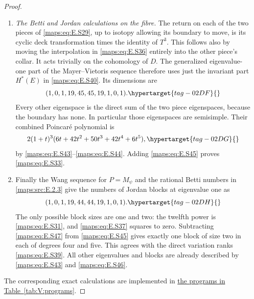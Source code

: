 \documentclass[11pt,a4paper]{article}
\numberwithin{equation}{section}
\theoremstyle{definition}
\begin{document}
\begin{proof}
\begin{enumerate}[label=\arabic*.,leftmargin=*]
\item \emph{The Betti and Jordan calculations on the fibre.}
The return on each of the two pieces of \eqref{maps:eq:E.S29}, up to
isotopy allowing its boundary to move, is its cyclic deck
transformation times the identity of $T^3$. This follows
also by moving the interpolation in \eqref{maps:eq:E.S36} entirely into
the other piece's collar. It acts trivially on the
cohomology of $D$. The generalized eigenvalue-one part of
the Mayer--Vietoris sequence therefore uses just the
invariant part $H^*(E)$ in \eqref{maps:eq:E.S40}. Its dimensions are
\begin{equation}
       (1,0,1,19,45,45,19,1,0,1).
 \hypertarget{tag-02DF}{}\label{maps:eq:E.S45}
\end{equation}
Every other eigenspace is the direct sum of the two piece
eigenspaces, because the boundary has none. In particular
those eigenspaces are semisimple. Their combined Poincar\'e
polynomial is
\begin{equation}
     2(1+t)^3(6t+42t^2+50t^3+42t^4+6t^5),
 \hypertarget{tag-02DG}{}\label{maps:eq:E.S46}
\end{equation}
by \eqref{maps:eq:E.S43}--\eqref{maps:eq:E.S44}. Adding \eqref{maps:eq:E.S45} proves \eqref{maps:eq:E.S33}.

\item Finally the Wang sequence for $P=M_\psi$ and the rational
Betti numbers in \cref{maps:src:E.2.3} give the numbers of Jordan blocks
at eigenvalue one as
\begin{equation}
          (1,0,1,19,44,44,19,1,0,1).
 \hypertarget{tag-02DH}{}\label{maps:eq:E.S47}
\end{equation}
The only possible block sizes are one and two: the
twelfth power is \eqref{maps:eq:E.S31}, and \eqref{maps:eq:E.S37} squares to zero.
Subtracting \eqref{maps:eq:E.S47} from \eqref{maps:eq:E.S45} gives exactly one block
of size two in each of degrees four and five. This agrees with the direct variation ranks \eqref{maps:eq:E.S39}.
All other eigenvalues and blocks are already described
by \eqref{maps:eq:E.S43} and \eqref{maps:eq:E.S46}. \end{enumerate}
The corresponding exact calculations are implemented in \hyperlink{prog:V:cyclic-cover}{the programs in Table~\ref*{tab:V:programs}}.
\end{proof}
\end{document}
